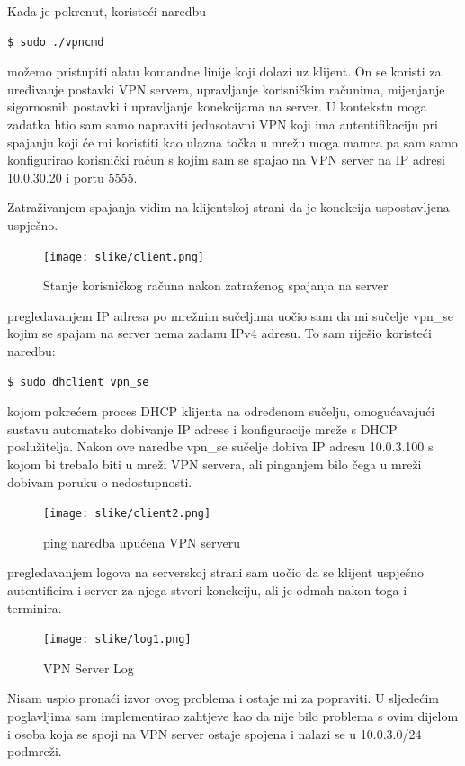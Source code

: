 \documentclass[times, utf8, zavrsni]{fer}
\begin{document}
Kada je pokrenut, koristeći naredbu
\begin{lstlisting}[language=bash, basicstyle=\footnotesize]
  $ sudo ./vpncmd
\end{lstlisting}

možemo pristupiti alatu komandne linije koji dolazi uz klijent. On se koristi za uređivanje postavki VPN servera, upravljanje korisničkim računima, mijenjanje sigornosnih postavki i upravljanje konekcijama na server. 
U kontekstu moga zadatka htio sam samo napraviti jednsotavni VPN koji ima autentifikaciju pri spajanju koji će mi koristiti kao ulazna točka u mrežu moga mamca pa sam samo konfigurirao korisnički račun s kojim sam se spajao na VPN server na IP adresi 10.0.30.20 i portu 5555. 

Zatraživanjem spajanja vidim na klijentskoj strani da je konekcija uspostavljena uspješno.
\begin{figure}[htb]
\centering
\texttt{[image: slike/client.png]}
\caption{Stanje korisničkog računa nakon zatraženog spajanja na server}
\label{fig:client}
\end{figure}

pregledavanjem IP adresa po mrežnim sučeljima uočio sam da mi sučelje vpn\_se kojim se spajam na server nema zadanu IPv4 adresu. To sam riješio koristeći naredbu:
\begin{lstlisting}[language=bash, basicstyle=\footnotesize]
  $ sudo dhclient vpn_se
\end{lstlisting}
kojom pokrećem proces DHCP klijenta na određenom sučelju, omogućavajući sustavu automatsko dobivanje IP adrese i konfiguracije mreže s DHCP poslužitelja. 
Nakon ove naredbe vpn\_se sučelje dobiva IP adresu 10.0.3.100 s kojom bi trebalo biti u mreži VPN servera, ali pinganjem bilo čega u mreži dobivam poruku o nedostupnosti.
\begin{figure}[htb]
\centering
\texttt{[image: slike/client2.png]}
\caption{ping naredba upućena VPN serveru}
\label{fig:client2}
\end{figure}

pregledavanjem logova na serverskoj strani sam uočio da se klijent uspješno autentificira i server za njega stvori konekciju, ali je odmah nakon toga i terminira. 
\begin{figure}[htb]
\centering
\texttt{[image: slike/log1.png]}
\caption{VPN Server Log}
\label{fig:log}
\end{figure}

Nisam uspio pronaći izvor ovog problema i ostaje mi za popraviti. U sljedećim poglavljima sam implementirao zahtjeve kao da nije bilo problema s ovim dijelom i osoba koja se spoji na VPN server ostaje spojena i nalazi se u 10.0.3.0/24 podmreži.
\end{document}
